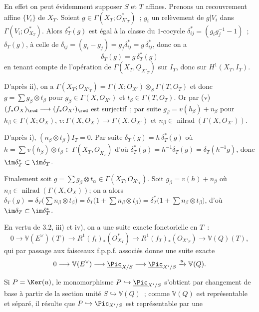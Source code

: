 

En
effet on peut évidemment supposer \(S\) et \(T\) affines. Prenons un recouvrement affine \(\{V_i\}\) de \(X_T\). Soient \(g\in\Gamma(X_T;{O}_{X'_T}^{*})\)~; \(g_i\) un relèvement de \(g|V_i\) dans \(\Gamma(V_i;{O}_{X_T}^{*})\). Alors \(\delta_T^*(g)\) est égal à la classe du \(1\)-cocycle \(\delta_{ij}^*=(g_ig_j^{-1}-1)\)~; \(\delta_T(g)\), à celle de \(\delta_{ij}=(g_i-g_j)=g_j\delta_{ij}^*=g\,\delta_{ij}^*\), donc on a
\[
  \delta_T(g)=g\,\delta_T^*(g)
\]
en tenant compte de l'opération de \(\Gamma(X_T,\underline{O}_{X'_T})\) sur \(I_T\), donc sur \(H^1(X_T,I_T)\).

D'après ii), on a \(\Gamma(X_T;{O}_{X'_T})=\Gamma(X;{O}_{X'})\otimes_S\Gamma(T,{O}_T)\) et donc \(g=\sum g_\beta\otimes t_\beta\) pour
\(g_\beta\in\Gamma(X,{O}_{X'})\) et
\(t_\beta\in\Gamma(T,{O}_T)\). Or par (v) \((f_*{O}_X)_{\red}\longrightarrow(f_*{O}_{X'})_{\red}\) est surjectif~; par suite \(g_\beta=v(h_\beta)+n_\beta\) pour
\(h_\beta\in\Gamma(X;{O}_X)\), \(v:\Gamma(X,{O}_X)\to
\Gamma(X,{O}_{X'})\) et
\(n_\beta\in\operatorname{nilrad}(\Gamma(X,{O}_{X'}))\).

D'après i),
\((n_\beta\otimes t_\beta)I_T=0\). Par suite \(\delta_T(g)=h\,\delta_T^*(g)\) où \(h=\sum v(h_\beta)\otimes t_\beta\in\Gamma(X_T,\underline{O}_{X_T})\) d'où \(\delta_T^*(g)=h^{-1}\delta_T(g)=\delta_T(h^{-1}g)\), donc \(\im\delta_T^*\subset\im\delta_T\).

Finalement soit \(g=\sum g_\beta\otimes t_\alpha\in
\Gamma(X_T,{O}_{X'_T})\). Soit \(g_\beta=v(h)+n_\beta\) où
\(n_\beta\in\operatorname{nilrad}(\Gamma(X,{O}_X))\); on a alors \(\delta_T(g)=\delta_T\bigl(\sum n_\beta\otimes t_\beta\bigr)=\delta_T\bigl(1+\sum n_\beta\otimes t_\beta\bigr)=\delta_T^*\bigl(1+\sum n_\beta\otimes t_\beta\bigr)\), d'où \(\im\delta_T\subset\im\delta_T^*\).

En vertu de 3.2, iii) et iv), on a une suite exacte fonctorielle en \(T\)~:
\[
  0\longrightarrow \mathbb V(E^\vee)(T)\longrightarrow
  R^1(f_t)_*({O}_{X_T}^{*})
  \longrightarrow
  R^1(f_T)_*({O}_{X'_T})
  \longrightarrow
  \mathbb V(Q)(T),
\]
qui par passage aux faisceaux f.p.p.f. associés donne une suite exacte
\[
  0\longrightarrow \mathbb V(E^\vee)\longrightarrow\underline{\Pic}_{X/S}
  \longrightarrow\underline{\Pic}_{X'/S}\xrightarrow{u}\mathbb V(Q).
\]

Si \(P=\Ker(u)\), le monomorphisme \(P\hookrightarrow\underline{\Pic}_{X'/S}\) s'obtient par changement de base à partir de la section unité \(S\hookrightarrow\mathbb V(Q)\)~; comme \(\mathbb V(Q)\) est représentable et séparé, il résulte que \(P\hookrightarrow\Pic_{X'/S}\) est représentable par une
